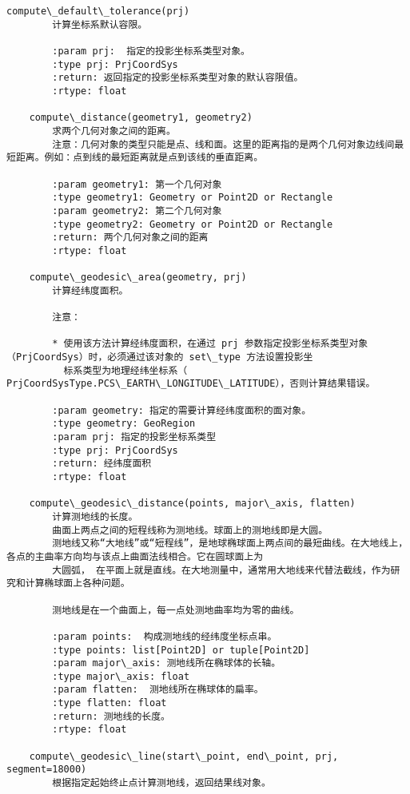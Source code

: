 \documentclass[11pt]{article}
\begin{document}
\begin{Verbatim}[commandchars=\\\{\}]
    compute\_default\_tolerance(prj)
        计算坐标系默认容限。
        
        :param prj:  指定的投影坐标系类型对象。
        :type prj: PrjCoordSys
        :return: 返回指定的投影坐标系类型对象的默认容限值。
        :rtype: float
    
    compute\_distance(geometry1, geometry2)
        求两个几何对象之间的距离。
        注意：几何对象的类型只能是点、线和面。这里的距离指的是两个几何对象边线间最短距离。例如：点到线的最短距离就是点到该线的垂直距离。
        
        :param geometry1: 第一个几何对象
        :type geometry1: Geometry or Point2D or Rectangle
        :param geometry2: 第二个几何对象
        :type geometry2: Geometry or Point2D or Rectangle
        :return: 两个几何对象之间的距离
        :rtype: float
    
    compute\_geodesic\_area(geometry, prj)
        计算经纬度面积。
        
        注意：
        
        * 使用该方法计算经纬度面积，在通过 prj 参数指定投影坐标系类型对象（PrjCoordSys）时，必须通过该对象的 set\_type 方法设置投影坐
          标系类型为地理经纬坐标系（ PrjCoordSysType.PCS\_EARTH\_LONGITUDE\_LATITUDE），否则计算结果错误。
        
        :param geometry: 指定的需要计算经纬度面积的面对象。
        :type geometry: GeoRegion
        :param prj: 指定的投影坐标系类型
        :type prj: PrjCoordSys
        :return: 经纬度面积
        :rtype: float
    
    compute\_geodesic\_distance(points, major\_axis, flatten)
        计算测地线的长度。
        曲面上两点之间的短程线称为测地线。球面上的测地线即是大圆。
        测地线又称“大地线”或“短程线”，是地球椭球面上两点间的最短曲线。在大地线上，各点的主曲率方向均与该点上曲面法线相合。它在圆球面上为
        大圆弧， 在平面上就是直线。在大地测量中，通常用大地线来代替法截线，作为研究和计算椭球面上各种问题。
        
        测地线是在一个曲面上，每一点处测地曲率均为零的曲线。
        
        :param points:  构成测地线的经纬度坐标点串。
        :type points: list[Point2D] or tuple[Point2D]
        :param major\_axis: 测地线所在椭球体的长轴。
        :type major\_axis: float
        :param flatten:  测地线所在椭球体的扁率。
        :type flatten: float
        :return: 测地线的长度。
        :rtype: float
    
    compute\_geodesic\_line(start\_point, end\_point, prj, segment=18000)
        根据指定起始终止点计算测地线，返回结果线对象。
        

\end{Verbatim}
\end{document}

